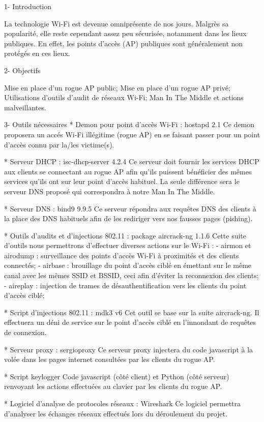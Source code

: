 1- Introduction

La technologie Wi-Fi est devenue omniprésente de nos jours. Malgrès sa popularité, elle reste cependant assez peu sécurisée, notamment dans les lieux publiques. En effet, les points d'accès (AP) publiques sont généralement non protégés en ces lieux. 

2- Objectifs

Mise en place d'un rogue AP public;
Mise en place d'un rogue AP privé;
Utilisations d'outils d'audit de réseaux Wi-Fi;
Man In The Middle et actions malveillantes.

3- Outils nécessaires
* Demon pour point d'accès Wi-Fi : hostapd 2.1
Ce demon proposera un accés Wi-Fi illégitime (rogue AP) en se faisant passer pour un point d'accès connu par la/les victime(s).

* Serveur DHCP : isc-dhcp-server 4.2.4
Ce serveur doit fournir les services DHCP aux clients se connectant au rogue AP afin qu'ils puissent bénéficier des mêmes services qu'ils ont sur leur point d'accès habituel. La seule différence sera le serveur DNS proposé qui correspondra à notre Man In The Middle.

* Serveur DNS : bind9 9.9.5
Ce serveur répondra aux requêtes DNS des clients à la place des DNS habituels afin de les rediriger vers nos fausses pages (pishing).

* Outils d'audits et d'injections 802.11 : package aircrack-ng 1.1.6
Cette suite d'outils nous permettrons d'effectuer diverses actions sur le Wi-Fi :
	- airmon et airodump : surveillance des points d'accès Wi-Fi à proximités et des clients connectés;
	- airbase : brouillage du point d'accès ciblé en émettant sur le même canal avec les mêmes SSID et BSSID, ceci afin d'éviter la reconnexion des clients;
	- aireplay : injection de trames de désauthentification vers les clients du point d'accès ciblé;

* Script d'injections 802.11 : mdk3 v6
Cet outil se base sur la suite aircrack-ng. Il effectuera un déni de service sur le point d'accès ciblé en l'innondant de requêtes de connexion.

* Serveur proxy : sergioproxy
Ce serveur proxy injectera du code javascript à la volée dans les pages internet consultées par les clients du rogue AP.

* Script keylogger
Code javascript (côté client) et Python (côté serveur) renvoyant les actions effectuées au clavier par les clients du rogue AP.

* Logiciel d'analyse de protocoles réseaux : Wireshark
Ce logiciel permettra d'analyser les échanges réseaux effectués lors du déroulement du projet.


